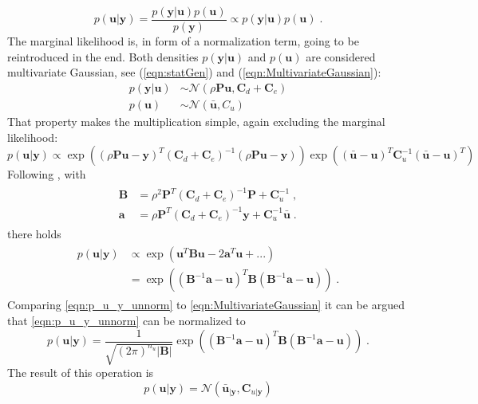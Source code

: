 \documentclass[%
  a4paper,oneside,%
  11pt,%
  smallchapters,
  style=printdev,
  extramargin,
  green,%
  rgb, <cmyk>
  ]{tubsbook}
\begin{document}
\begin{equation}
p(\bm{u}|\bm{y}) = \frac{p(\bm{y}|\bm{u})p(\bm{u})}{p(\bm{y})} \propto p(\bm{y}|\bm{u})p(\bm{u}) \;.
\label{eqn:bayesPrior}
\end{equation}
The marginal likelihood is, in form of a normalization term, going to be reintroduced in the end. Both densities $p(\bm{y}|\bm{u})$ and $p(\bm{u})$ are considered multivariate Gaussian, see (\ref{eqn:statGen}) and (\ref{eqn:MultivariateGaussian}):
\begin{align}
p(\bm{y}|\bm{u}) &\sim \mathcal{N} (\rho \bm{P} \bm{u}, \bm{C}_d + \bm{C}_e) \\
p(\bm{u}) &\sim \mathcal{N}(\bm{\bar{u}},C_u)
\end{align}
%
That property makes the multiplication simple, again excluding the marginal likelihood:
\begin{equation}
p(\bm{u}|\bm{y}) \propto  \exp(  (\rho \bm{P} \bm{u} -\bm{y})^T (\bm{C}_d + \bm{C}_e)^{-1} (\rho \bm{P} \bm{u} -\bm{y})  ) \exp(  (\bar{\bm{u}} - \bm{u})^T \bm{C}_u^{-1}  (\bar{\bm{u}} - \bm{u})^T) 
\end{equation}
Following \cite{girolami2021}, with
\begin{align}
\begin{split}
\bm{B} &= \rho^2 \bm{P}^T (\bm{C}_d +\bm{C}_e)^{-1} \bm{P} + \bm{C}_u^{-1}\;, \\
\bm{a} &= \rho \bm{P}^T (\bm{C}_d +\bm{C}_e)^{-1} \bm{y} + \bm{C}_u^{-1} \bm{\bar{u}} \;.
\end{split}
\end{align}
there holds
\begin{align}
\begin{split}
p(\bm{u}|\bm{y}) &\propto \exp(\bm{u}^T \bm{B} \bm{u} - 2\bm{a}^T\bm{u} + ... ) \\
&= \exp( (\bm{B}^{-1} \bm{a} - \bm{u} )^T  \bm{B} (\bm{B}^{-1} \bm{a} - \bm{u} ) ) \;.
\label{eqn:p_u_y_unnorm}
\end{split}
\end{align}
Comparing \eqref{eqn:p_u_y_unnorm} to \eqref{eqn:MultivariateGaussian} it can be argued that \eqref{eqn:p_u_y_unnorm} can be normalized to 
\begin{equation}
p(\bm{u}|\bm{y}) = \frac{1}{\sqrt{(2\pi)^{n_u} \lvert \bm{B} \rvert}} \exp( (\bm{B}^{-1} \bm{a} - \bm{u} )^T  \bm{B} (\bm{B}^{-1} \bm{a} - \bm{u} ) ) \;.
\end{equation} 
%
The result of this operation is
%
\begin{equation}
p(\bm{u}|\bm{y}) = \mathcal{N}(\bar{\bm{u}}_{|\bm{y}}, \bm{C}_{u|\bm{y}})
\label{eqn:statFEMConditioned}
\end{equation}
\end{document}
